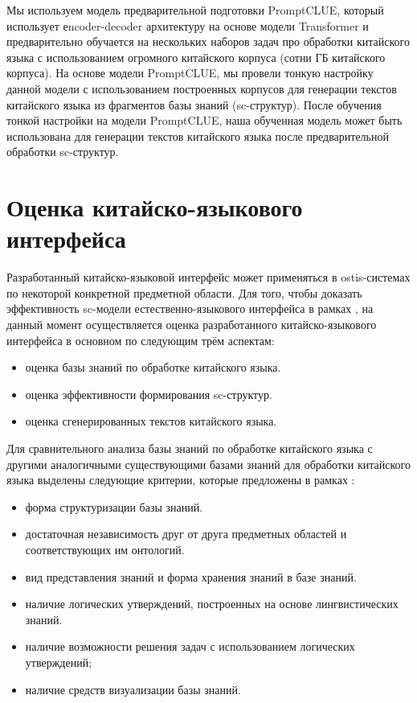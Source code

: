 Мы используем модель предварительной подготовки PromptCLUE, который использует еncoder-decoder архитектуру на основе модели Transformer и предварительно обучается на нескольких наборов задач про обработки китайского языка с использованием огромного китайского корпуса (сотни ГБ китайского корпуса).  На основе модели PromptCLUE, мы провели тонкую настройку данной модели с использованием построенных корпусов для генерации текстов китайского языка из фрагментов базы знаний (sc-структур). После обучения тонкой настройки на модели PromptCLUE, наша обученная модель может быть использована для генерации текстов китайского языка после предварительной обработки sc-структур. 

\section{Оценка китайско-языкового интерфейса}
Разработанный китайско-языковой интерфейс может применяться в ostis-системах по некоторой конкретной предметной области. Для того, чтобы доказать эффективность sc-модели естественно-языкового интерфейса в рамках , на данный момент осуществляется оценка разработанного китайско-языкового интерфейса в основном по следующим трём аспектам:
\begin{itemize}
	\item оценка базы знаний по обработке китайского языка.
	\item оценка эффективности формирования sc-структур.
	\item оценка сгенерированных текстов китайского языка.
\end{itemize}

Для сравнительного анализа базы знаний по обработке китайского языка с другими аналогичными существующими базами знаний для обработки китайского языка выделены следующие критерии, которые предложены в рамках :
\begin{itemize}
	\item форма структуризации базы знаний.
	\item достаточная независимость друг от друга предметных областей и соответствующих им онтологий.
	\item вид представления знаний и форма хранения знаний в базе знаний.
	\item наличие логических утверждений, построенных на основе лингвистических знаний.
	\item наличие возможности решения задач с использованием логических утверждений;
	\item наличие средств визуализации базы знаний.
\end{itemize}

